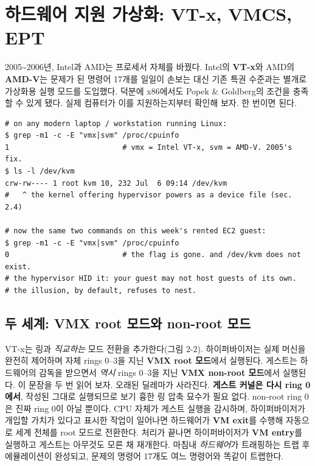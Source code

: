 \section{하드웨어 지원 가상화: VT-x, VMCS, EPT}

2005\textasciitilde{}2006년, Intel과 AMD는 프로세서 자체를 바꿨다. Intel의 \textbf{VT-x}와 AMD의 \textbf{AMD-V}는 문제가 된 명령어 17개를 일일이 손보는 대신 기존 특권 수준과는 별개로 가상화용 실행 모드를 도입했다. 덕분에 x86에서도 Popek \& Goldberg의 조건을 충족할 수 있게 됐다. 실제 컴퓨터가 이를 지원하는지부터 확인해 보자.  한 번이면 된다.

\begin{terminalbox}
\begin{Verbatim}[breaklines=true,breakanywhere=true,fontsize=\small,formatcom=\color{tbbtermfg},codes=\tbbcodeactive]
# on any modern laptop / workstation running Linux:
$ grep -m1 -c -E "vmx|svm" /proc/cpuinfo
1                          # vmx = Intel VT-x, svm = AMD-V. 2005's fix.
$ ls -l /dev/kvm
crw-rw---- 1 root kvm 10, 232 Jul  6 09:14 /dev/kvm
#   ^ the kernel offering hypervisor powers as a device file (sec. 2.4)

# now the same two commands on this week's rented EC2 guest:
$ grep -m1 -c -E "vmx|svm" /proc/cpuinfo
0                          # the flag is gone. and /dev/kvm does not exist.
# the hypervisor HID it: your guest may not host guests of its own.
# the illusion, by default, refuses to nest.
\end{Verbatim}
\end{terminalbox}

\subsection*{두 세계: VMX root 모드와 non-root 모드}

VT-x는 링과 \textit{직교하는} 모드 전환을 추가한다(그림 2-2). 하이퍼바이저는 실제 머신을 완전히 제어하며 자체 rings 0–3을 지닌 \textbf{VMX root 모드}에서 실행된다. 게스트는 하드웨어의 감독을 받으면서 \textit{역시} rings 0–3을 지닌 \textbf{VMX non-root 모드}에서 실행된다. 이 문장을 두 번 읽어 보자. 오래된 딜레마가 사라진다. \textbf{게스트 커널은 다시 ring 0에서}, 작성된 그대로 실행되므로 보기 흉한 링 압축 묘수가 필요 없다. non-root ring 0은 진짜 ring 0이 아닐 뿐이다. CPU 자체가 게스트 실행을 감시하며, 하이퍼바이저가 개입할 가치가 있다고 표시한 작업이 일어나면 하드웨어가 \textbf{VM exit}를 수행해 자동으로 세계 전체를 root 모드로 전환한다. 처리가 끝나면 하이퍼바이저가 \textbf{VM entry}를 실행하고 게스트는 아무것도 모른 채 재개한다. 마침내 \textit{하드웨어}가 트래핑하는 트랩 후 에뮬레이션이 완성되고, 문제의 명령어 17개도 여느 명령어와 똑같이 트랩한다.

